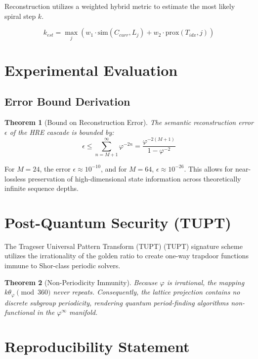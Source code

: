 \documentclass[11pt,a4paper,oneside]{article}
\newtheorem{theorem}{Theorem}[section]
\theoremstyle{definition}
\theoremstyle{remark}
\newcommand{\phiinf}{\varphi^\infty}
\begin{document}
Reconstruction utilizes a weighted hybrid metric to estimate the most likely spiral step $k$.

\begin{equation}
    k_{est} = \max_j (w_1 \cdot \text{sim}(C_{curr}, L_j) + w_2 \cdot \text{prox}(T_{idx}, j))
\end{equation}

\section{Experimental Evaluation}

\subsection{Error Bound Derivation}

\begin{theorem}[Bound on Reconstruction Error]
The semantic reconstruction error $\epsilon$ of the HRE cascade is bounded by:
\begin{equation}
    \epsilon \leq \sum_{n=M+1}^\infty \varphi^{-2n} = \frac{\varphi^{-2(M+1)}}{1 - \varphi^{-2}}
\end{equation}
\end{theorem}

For $M=24$, the error $\epsilon \approx 10^{-10}$, and for $M=64$, $\epsilon \approx 10^{-26}$. This allows for near-lossless preservation of high-dimensional state information across theoretically infinite sequence depths.

\section{Post-Quantum Security (TUPT)}

The Trageser Universal Pattern Transform (TUPT) (TUPT) signature scheme utilizes the irrationality of the golden ratio to create one-way trapdoor functions immune to Shor-class periodic solvers. 

\begin{theorem}[Non-Periodicity Immunity]
Because $\varphi$ is irrational, the mapping $k \theta_\varphi \pmod{360}$ never repeats. Consequently, the lattice projection contains no discrete subgroup periodicity, rendering quantum period-finding algorithms non-functional in the $\phiinf$ manifold.
\end{theorem}

\section{Reproducibility Statement}
\end{document}
